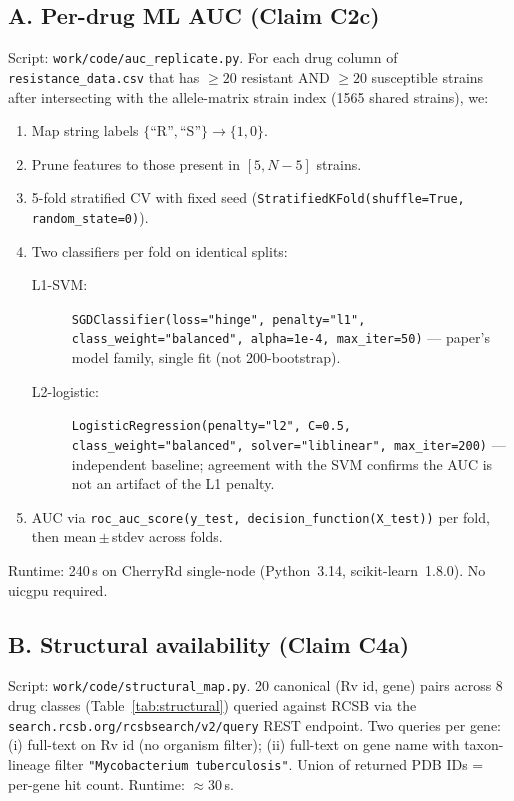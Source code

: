 \documentclass[11pt,letterpaper]{article}
\begin{document}
\subsection{A. Per-drug ML AUC (Claim C2c)}
Script: \texttt{work/code/auc\_replicate.py}. For each drug column of
\texttt{resistance\_data.csv} that has \(\geq 20\) resistant AND \(\geq 20\)
susceptible strains after intersecting with the allele-matrix strain index
(1565 shared strains), we:
\begin{enumerate}
  \item Map string labels \(\{\text{``R''},\text{``S''}\}\to\{1,0\}\).
  \item Prune features to those present in \([5, N{-}5]\) strains.
  \item 5-fold stratified CV with fixed seed
        (\texttt{StratifiedKFold(shuffle=True, random\_state=0)}).
  \item Two classifiers per fold on identical splits:
        \begin{description}
          \item[L1-SVM:] \texttt{SGDClassifier(loss="hinge", penalty="l1",\\
                class\_weight="balanced", alpha=1e-4, max\_iter=50)} ---
                paper's model family, single fit (not 200-bootstrap).
          \item[L2-logistic:] \texttt{LogisticRegression(penalty="l2", C=0.5,\\
                class\_weight="balanced", solver="liblinear", max\_iter=200)}
                --- independent baseline; agreement with the SVM confirms the
                AUC is not an artifact of the L1 penalty.
        \end{description}
  \item AUC via \verb|roc_auc_score(y_test, decision_function(X_test))| per
        fold, then mean\,\(\pm\)\,stdev across folds.
\end{enumerate}
Runtime: 240\,s on CherryRd single-node (Python~3.14, scikit-learn~1.8.0).
No uicgpu required.

\subsection{B. Structural availability (Claim C4a)}
Script: \texttt{work/code/structural\_map.py}. 20 canonical (Rv id, gene)
pairs across 8 drug classes (Table~\ref{tab:structural}) queried against RCSB
via the \texttt{search.rcsb.org/rcsbsearch/v2/query} REST endpoint. Two
queries per gene: (i) full-text on Rv id (no organism filter); (ii) full-text
on gene name with taxon-lineage filter
\verb|"Mycobacterium tuberculosis"|. Union of returned PDB IDs = per-gene
hit count. Runtime: \(\approx 30\)\,s.
\end{document}

